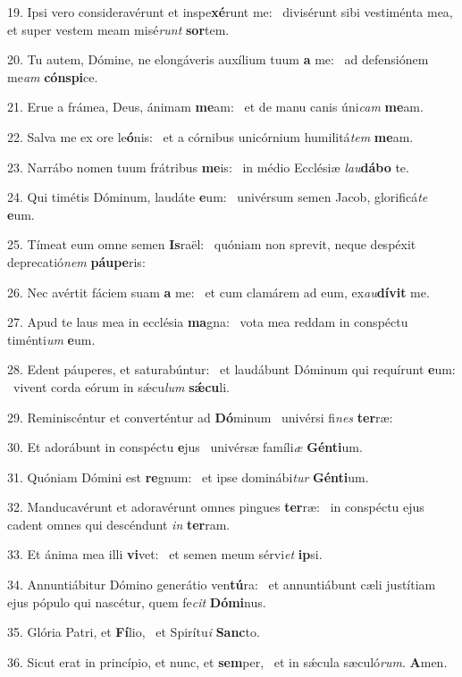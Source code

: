 19. Ipsi vero consideravérunt et inspe\textbf{xé}runt me: \ast\  divisérunt sibi vestiménta mea, et super vestem meam misé\textit{runt} \textbf{sor}tem.\

20. Tu autem, Dómine, ne elongáveris auxílium tuum \textbf{a} me: \ast\  ad defensiónem me\textit{am} \textbf{cón}\textbf{spi}ce.\

21. Erue a frámea, Deus, ánimam \textbf{me}am: \ast\  et de manu canis úni\textit{cam} \textbf{me}am.\

22. Salva me ex ore le\textbf{ó}nis: \ast\  et a córnibus unicórnium humilitá\textit{tem} \textbf{me}am.\

23. Narrábo nomen tuum frátribus \textbf{me}is: \ast\  in médio Ecclésiæ \textit{lau}\textbf{dá}\textbf{bo} te.\

24. Qui timétis Dóminum, laudáte \textbf{e}um: \ast\  univérsum semen Jacob, glorificá\textit{te} \textbf{e}um.\

25. Tímeat eum omne semen \textbf{Is}raël: \ast\  quóniam non sprevit, neque despéxit deprecatió\textit{nem} \textbf{páu}\textbf{pe}ris:\

26. Nec avértit fáciem suam \textbf{a} me: \ast\  et cum clamárem ad eum, ex\textit{au}\textbf{dí}\textbf{vit} me.\

27. Apud te laus mea in ecclésia \textbf{ma}gna: \ast\  vota mea reddam in conspéctu timénti\textit{um} \textbf{e}um.\

28. Edent páuperes, et saturabúntur: \dag\  et laudábunt Dóminum qui requírunt \textbf{e}um: \ast\  vivent corda eórum in sǽcu\textit{lum} \textbf{sǽ}\textbf{cu}li.\

29. Reminiscéntur et converténtur ad \textbf{Dó}minum \ast\  univérsi fi\textit{nes} \textbf{ter}ræ:\

30. Et adorábunt in conspéctu \textbf{e}jus \ast\  univérsæ famíli\textit{æ} \textbf{Gén}\textbf{ti}um.\

31. Quóniam Dómini est \textbf{re}gnum: \ast\  et ipse dominábi\textit{tur} \textbf{Gén}\textbf{ti}um.\

32. Manducavérunt et adoravérunt omnes pingues \textbf{ter}ræ: \ast\  in conspéctu ejus cadent omnes qui descéndunt \textit{in} \textbf{ter}ram.\

33. Et ánima mea illi \textbf{vi}vet: \ast\  et semen meum sérvi\textit{et} \textbf{ip}si.\

34. Annuntiábitur Dómino generátio ven\textbf{tú}ra: \ast\  et annuntiábunt cæli justítiam ejus pópulo qui nascétur, quem fe\textit{cit} \textbf{Dó}\textbf{mi}nus.\

35. Glória Patri, et \textbf{Fí}lio, \ast\  et Spirítu\textit{i} \textbf{Sanc}to.\

36. Sicut erat in princípio, et nunc, et \textbf{sem}per, \ast\  et in sǽcula sæculó\textit{rum}. \textbf{A}men.\

